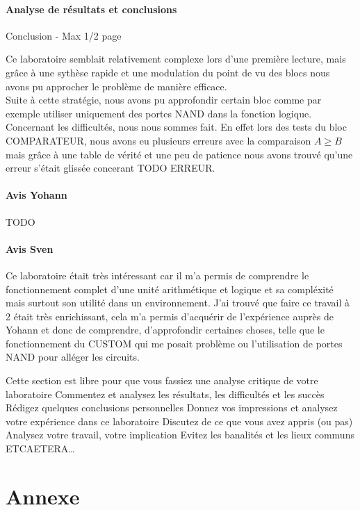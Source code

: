 \documentclass[a4paper]{article}
\begin{document}
\paragraph{Analyse de résultats et conclusions}
\begin{tcolorbox}[colframe=Monokaimagenta,colback=white]
Conclusion - Max 1/2 page 

Ce laboratoire semblait relativement complexe lors d'une première lecture, mais grâce à une sythèse rapide et une modulation du point de vu des blocs nous avons pu approcher le problème de manière efficace.\\
Suite à cette stratégie, nous avons pu approfondir certain bloc comme par exemple utiliser uniquement des portes NAND dans la fonction logique.
Concernant les difficultés, nous nous sommes fait. En effet lors des tests du bloc COMPARATEUR, nous avons eu plusieurs erreurs avec la comparaison $A \ge B$ mais grâce à une table de vérité et une peu de patience nous avons trouvé qu'une erreur s'était glissée concerant TODO ERREUR.
\paragraph{Avis Yohann}
TODO
\paragraph{Avis Sven}
Ce laboratoire était très intéressant car il m'a permis de comprendre le fonctionnement complet d'une unité arithmétique et logique et sa compléxité mais surtout son utilité dans un environnement. J'ai trouvé que faire ce travail à 2 était très enrichissant, cela m'a permis d'acquérir de l'expérience auprès de Yohann et donc de comprendre, d'approfondir certaines choses, telle que le fonctionnement du CUSTOM qui me posait problème ou l'utilisation de portes NAND pour alléger les circuits.

Cette section est libre pour que vous fassiez une analyse critique de votre laboratoire
Commentez et analysez 
les résultats, 
les difficultés et les succès
Rédigez quelques conclusions personnelles
Donnez vos impressions et analysez votre expérience dans ce laboratoire
Discutez de ce que vous avez appris (ou pas)
Analysez votre travail, votre implication
Evitez les banalités et les lieux communs
ETCAETERA…
\end{tcolorbox}

\newpage

\section{Annexe}
\end{document}
